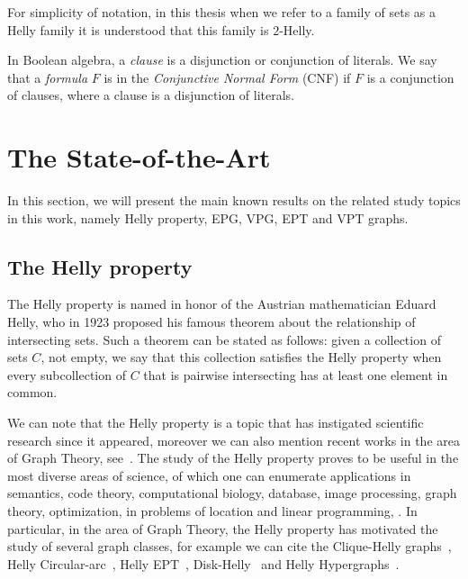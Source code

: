 For simplicity of notation, in this thesis when we refer to a family of sets as a Helly family it is understood that this family is $ 2$-Helly.

In Boolean algebra, a \emph{clause} is a disjunction or conjunction of literals. We say that a \emph{formula} $ F $ is in the \emph{Conjunctive Normal Form} (CNF) if $ F $ is a conjunction of clauses, where a clause is a disjunction of literals.

\section{The State-of-the-Art}

In this section, we will present the main known results on the related study topics in this work, namely Helly property, EPG, VPG, EPT and VPT graphs.

\subsection{The Helly property}


The Helly property is named in honor of the Austrian mathematician Eduard Helly, who in 1923 proposed his famous theorem about the relationship of intersecting sets. Such a theorem can be  stated as follows: given a collection of  sets $ C$, not empty, we say that this collection satisfies the Helly property when every subcollection of $C$ that is pairwise intersecting has at least one element in common.


We can note that the Helly property is a topic that has instigated scientific research since it appeared, moreover we can also mention recent works in the area of Graph Theory, see~\cite{berge1973, bergeDuchet1975, DOURADO2008, golumbic2013, dourado2006computational, teles2016, jose2018}.
The study of the Helly property proves to be useful in the most diverse areas of science, of which one can enumerate applications in semantics, code theory, computational biology, database, image processing, graph theory, optimization, in problems of location and linear programming, \cite{teles2016}. In particular, in the area of Graph Theory, the Helly property has motivated the study of several graph classes, for example we can cite the  Clique-Helly graphs~\cite{DOURADO2008}, Helly Circular-arc~\cite{safe2016essential}, Helly EPT~\cite{alcon2017helly}, Disk-Helly~\cite{lin2007faster} and Helly Hypergraphs~\cite{mulder1979median}.


